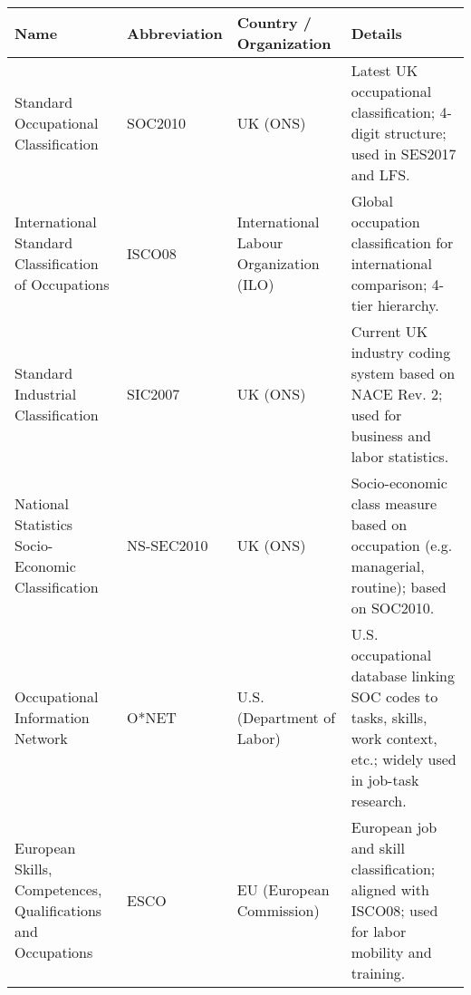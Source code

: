     \begin{tabular}{@{}p{7cm}p{2.5cm}p{4cm}p{10cm}@{}}
    \toprule
    \textbf{Name} & \textbf{Abbreviation} & \textbf{Country / Organization} & \textbf{Details} \\
    \midrule
    
    Standard Occupational Classification & SOC2010 & UK (ONS) & Latest UK occupational classification; 4-digit structure; used in SES2017 and LFS. \\
    \addlinespace
    International Standard Classification of Occupations & ISCO08 & International Labour Organization (ILO) & Global occupation classification for international comparison; 4-tier hierarchy. \\
    \addlinespace
    Standard Industrial Classification  & SIC2007 & UK (ONS) & Current UK industry coding system based on NACE Rev. 2; used for business and labor statistics. \\
    \addlinespace
    National Statistics Socio-Economic Classification  & NS-SEC2010 & UK (ONS) & Socio-economic class measure based on occupation (e.g. managerial, routine); based on SOC2010. \\
    \addlinespace
    Occupational Information Network & O*NET & U.S. (Department of Labor) & U.S. occupational database linking SOC codes to tasks, skills, work context, etc.; widely used in job-task research. \\
    \addlinespace
    European Skills, Competences, Qualifications and Occupations & ESCO & EU (European Commission) & European job and skill classification; aligned with ISCO08; used for labor mobility and training. \\
    
    \bottomrule
    \end{tabular}

    